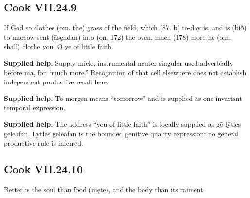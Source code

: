 \par\begin{minipage}{\linewidth}\raggedright
\subsection*{Cook VII.24.9}

If God so clothes (om. the) grass of the field, which (87. b) to-day is, and is (bið) to-morrow sent (āsęndan) into (on, 172) the oven, much (178) more he (om. shall) clothe you, O ye of little faith.

\end{minipage}\par\addvspace{4pt}

\textbf{Supplied help.} Supply micle, instrumental neuter singular used adverbially before mā, for “much more.” Recognition of that cell elsewhere does not establish independent productive recall here.

\textbf{Supplied help.} Tō-morgen means “tomorrow” and is supplied as one invariant temporal expression.

\textbf{Supplied help.} The address “you of little faith” is locally supplied as gē lȳtles gelēafan. Lȳtles gelēafan is the bounded genitive quality expression; no general productive rule is inferred.

\par\begin{minipage}{\linewidth}\raggedright
\subsection*{Cook VII.24.10}

Better is the soul than food (męte), and the body than its raiment.

\end{minipage}\par\addvspace{4pt}

